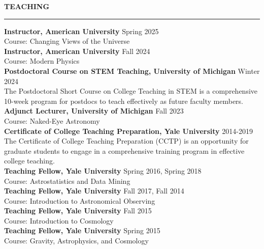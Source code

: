 \documentclass[12pt]{article}
\renewenvironment{section}[1]
  {
  \medskip
  {\color{aublue} \MakeUppercase{\bf #1}}
  \smallskip
  \hrule
  \medskip
  \begin{adjustwidth}{0.3cm}{}
  }
  {
  \end{adjustwidth}
  }
\newcommand{\entry}[3]{{\bf #1} \hfill {#2} \\ {#3}}
\begin{document}
\begin{section}{Teaching}
  \entry{Instructor, American University}{Spring 2025}{Course: Changing Views of the Universe} \medskip \\
  \entry{Instructor, American University}{Fall 2024}{Course: Modern Physics} \medskip \\
  \entry{Postdoctoral Course on STEM Teaching, University of Michigan}{Winter 2024}{The Postdoctoral Short Course on College Teaching in STEM is a comprehensive 10-week program for postdocs to teach effectively as future faculty members.} \medskip \\
  \entry{Adjunct Lecturer, University of Michigan}{Fall 2023}{Course: Naked-Eye Astronomy} \medskip \\
  \entry{Certificate of College Teaching Preparation, Yale University}{2014-2019}{The Certificate of College Teaching Preparation (CCTP) is an opportunity for graduate students to engage in a comprehensive training program in effective college teaching.} \medskip \\
  \entry{Teaching Fellow, Yale University}{Spring 2016, Spring 2018}{Course: Astrostatistics and Data Mining} \medskip \\
  \entry{Teaching Fellow, Yale University}{Fall 2017, Fall 2014}{Course: Introduction to Astronomical Observing} \medskip \\
  \entry{Teaching Fellow, Yale University}{Fall 2015}{Course: Introduction to Cosmology} \medskip \\
  \entry{Teaching Fellow, Yale University}{Spring 2015}{Course: Gravity, Astrophysics, and Cosmology}
\end{section}
\end{document}
